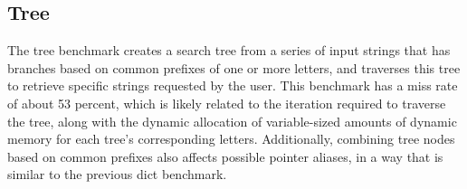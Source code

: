 \subsection{Tree}
The tree benchmark creates a search tree from a series of input strings that has branches based on common prefixes of one or more letters, and traverses this tree to retrieve specific strings requested by the user. This benchmark has a miss rate of about 53 percent, which is likely related to the iteration required to traverse the tree, along with the dynamic allocation of variable-sized amounts of dynamic memory for each tree's corresponding letters. Additionally, combining tree nodes based on common prefixes also affects possible pointer aliases, in a way that is similar to the previous dict benchmark.
